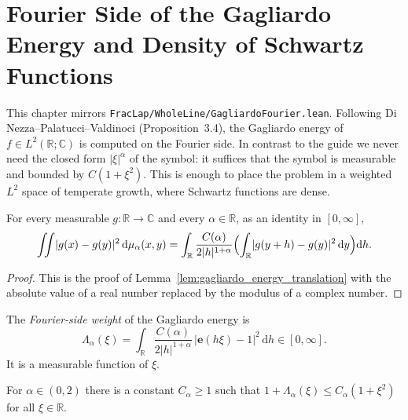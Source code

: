 \chapter{Fourier Side of the Gagliardo Energy and Density of Schwartz Functions}

This chapter mirrors \texttt{FracLap/WholeLine/GagliardoFourier.lean}. Following Di Nezza--Palatucci--Valdinoci (Proposition~3.4), the Gagliardo energy of $f \in L^2(\mathbb{R}; \mathbb{C})$ is computed on the Fourier side. In contrast to the guide we never need the closed form $\lvert \xi \rvert^\alpha$ of the symbol: it suffices that the symbol is measurable and bounded by $C(1 + \xi^2)$. This is enough to place the problem in a weighted $L^2$ space of temperate growth, where Schwartz functions are dense.

\begin{lemma}\label{lem:gagliardo_energy_translation_complex}
\leanok
For every measurable $g : \mathbb{R} \to \mathbb{C}$ and every $\alpha \in \mathbb{R}$, as an identity in $[0, \infty]$,
\[
  \iint \lvert g(x) - g(y) \rvert^2 \, \mathrm{d}\mu_\alpha(x, y)
  = \int_{\mathbb{R}} \frac{C(\alpha)}{2 \lvert h \rvert^{1 + \alpha}} \Bigl( \int_{\mathbb{R}} \lvert g(y + h) - g(y) \rvert^2 \, \mathrm{d}y \Bigr) \mathrm{d}h.
\]
\end{lemma}

\begin{proof}
\leanok
This is the proof of Lemma~\ref{lem:gagliardo_energy_translation} with the absolute value of a real number replaced by the modulus of a complex number.
\end{proof}

\begin{definition}\label{def:gagliardo_symbol}
\leanok
The \emph{Fourier-side weight} of the Gagliardo energy is
\[
  \Lambda_\alpha(\xi) = \int_{\mathbb{R}} \frac{C(\alpha)}{2 \lvert h \rvert^{1 + \alpha}} \,\bigl\lvert \mathbf{e}(h \xi) - 1 \bigr\rvert^2 \, \mathrm{d}h \in [0, \infty].
\]
It is a measurable function of $\xi$.
\end{definition}

\begin{lemma}\label{lem:gagliardo_symbol_bound}
\leanok
For $\alpha \in (0, 2)$ there is a constant $C_\alpha \ge 1$ such that $1 + \Lambda_\alpha(\xi) \le C_\alpha (1 + \xi^2)$ for all $\xi \in \mathbb{R}$.
\end{lemma}

